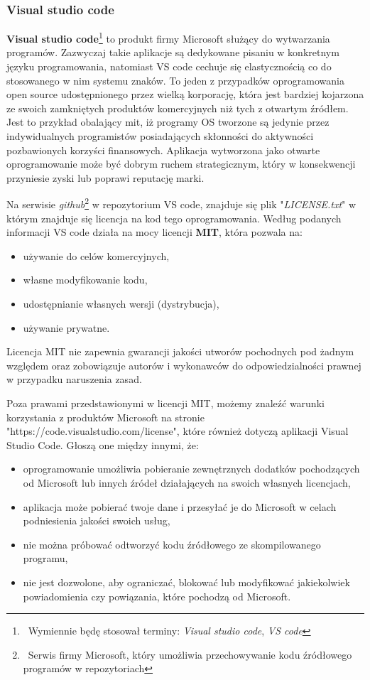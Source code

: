 \documentclass{article}
\begin{document}
\subsubsection{Visual studio code}

\textbf{Visual studio code}\footnote{\, Wymiennie będę stosował terminy: \emph{Visual studio code}, \emph{VS code}} to produkt firmy Microsoft służący do wytwarzania programów. Zazwyczaj takie aplikacje są dedykowane pisaniu w konkretnym języku programowania, natomiast VS code cechuje się elastycznością co do stosowanego w nim systemu znaków. To jeden z przypadków oprogramowania open source udostępnionego przez wielką korporację, która jest bardziej kojarzona ze swoich zamkniętych produktów komercyjnych niż tych z otwartym źródłem. Jest to przykład obalający mit, iż programy OS tworzone są jedynie przez indywidualnych programistów posiadających skłonności do aktywności pozbawionych korzyści finansowych. Aplikacja wytworzona jako otwarte oprogramowanie może być dobrym ruchem strategicznym, który w konsekwencji przyniesie zyski lub poprawi reputację marki.

Na serwisie \emph{github}\footnote{\, Serwis firmy Microsoft, który umożliwia przechowywanie kodu źródłowego programów w repozytoriach} w repozytorium VS code, znajduje się plik "\emph{LICENSE.txt}" w którym znajduje się licencja na kod tego oprogramowania. Według podanych informacji VS code działa na mocy licencji \textbf{MIT}, która pozwala na:
\begin{itemize}
    \item używanie do celów komercyjnych,
    \item własne modyfikowanie kodu,
    \item udostępnianie własnych wersji (dystrybucja),
    \item używanie prywatne.
\end{itemize}
Licencja MIT nie zapewnia gwarancji jakości utworów pochodnych pod żadnym względem oraz zobowiązuje autorów i wykonawców do odpowiedzialności prawnej w przypadku naruszenia zasad\cite{vscode.mit}.

Poza prawami przedstawionymi w licencji MIT, możemy znaleźć warunki korzystania z produktów Microsoft na stronie "https://code.visualstudio.com/license"\cite{vscode.microsoft}, które również dotyczą aplikacji Visual Studio Code. Głoszą one między innymi, że:
\begin{itemize}
    \item oprogramowanie umożliwia pobieranie zewnętrznych dodatków pochodzących od Microsoft lub innych źródeł działających na swoich własnych licencjach,
    \item aplikacja może pobierać twoje dane i przesyłać je do Microsoft w celach podniesienia jakości swoich usług,
    \item nie można próbować odtworzyć kodu źródłowego ze skompilowanego programu,
    \item nie jest dozwolone, aby ograniczać, blokować lub modyfikować jakiekolwiek powiadomienia czy powiązania, które pochodzą od Microsoft\cite{vscode.microsoft}.
\end{itemize}
\end{document}

